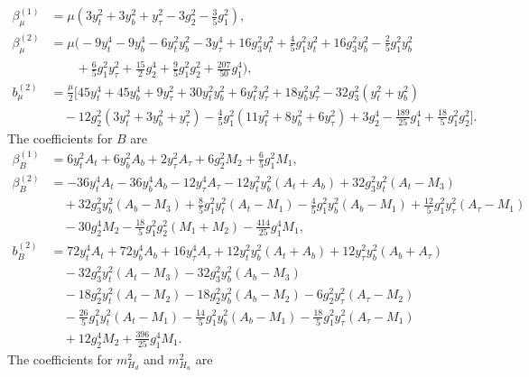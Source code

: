 \documentclass[preprint,amsmath,amssymb,aps,superscriptaddress,prd,showpacs,floatfix]{revtex4-1}
\begin{document}
\begin{subequations}\label{eq:MSSMmubetas}
\begin{align}
\beta_\mu^{(1)}&=\mu\left ( 3y_t^2+3y_b^2+y_\tau^2-3g_2^2-\frac{3}{5}g_1^2\right ),\label{eq:MSSMmubeta1}\\
\beta_\mu^{(2)}&=\mu \bigg ( -9y_t^4-9y_b^4-6y_t^2y_b^2-3y_\tau^4+16g_3^2y_t^2+\frac{4}{5}g_1^2y_t^2+16g_3^2y_b^2-\frac{2}{5}g_1^2y_b^2\nonumber\\
&\qquad{}+\frac{6}{5}g_1^2y_\tau^2+\frac{15}{2}g_2^4+\frac{9}{5}g_1^2g_2^2+\frac{207}{50}g_1^4\bigg ),\label{eq:MSSMmubeta2}\\
b_\mu^{(2)}&=\frac{\mu}{2}\Bigg [ 45y_t^4+45y_b^4+9y_\tau^2+30y_t^2y_b^2+6y_t^2y_\tau^2+18y_b^2y_\tau^2-32g_3^2(y_t^2+y_b^2)\nonumber\\
&\quad{}-12g_2^2(3y_t^2+3y_b^2+y_\tau^2)-\frac{4}{5}g_1^2(11y_t^2+8y_b^2+6y_\tau^2)+3g_2^4-\frac{189}{25}g_1^4+\frac{18}{5}g_1^2g_2^2\Bigg ].\label{eq:MSSMmub2}
\end{align}
\end{subequations}
The coefficients for $B$ are 
\begin{subequations}\label{eq:MSSMBbetas}
\begin{align}
\beta_B^{(1)}&=6y_t^2A_t+6y_b^2A_b+2y_\tau^2A_\tau+6g_2^2M_2+\frac{6}{5}g_1^2M_1,\label{eq:MSSMBbeta1}\\
\beta_B^{(2)}&=-36y_t^4A_t-36y_b^4A_b-12y_\tau^4A_\tau-12y_t^2y_b^2(A_t+A_b)+32g_3^2y_t^2(A_t-M_3)\nonumber\\
&\quad{}+32g_3^2y_b^2(A_b-M_3)+\frac{8}{5}g_1^2y_t^2(A_t-M_1)-\frac{4}{5}g_1^2y_b^2(A_b-M_1)+\frac{12}{5}g_1^2y_\tau^2(A_\tau-M_1)\nonumber\\
&\quad{}-30g_2^4M_2-\frac{18}{5}g_1^2g_2^2(M_1+M_2)-\frac{414}{25}g_1^4M_1,\label{eq:MSSMBbeta2}\\
b_B^{(2)}&=72y_t^4A_t+72y_b^4A_b+16y_\tau^4A_\tau+12y_t^2y_b^2(A_t+A_b)+12y_\tau^2y_b^2(A_b+A_\tau)\nonumber\\
&\quad{}-32g_3^2y_t^2(A_t-M_3)-32g_3^2y_b^2(A_b-M_3)\nonumber\\
&\quad{}-18g_2^2y_t^2(A_t-M_2)-18g_2^2y_b^2(A_b-M_2)-6g_2^2y_\tau^2(A_\tau-M_2)\nonumber\\
&\quad{}-\frac{26}{5}g_1^2y_t^2(A_t-M_1)-\frac{14}{5}g_1^2y_b^2(A_b-M_1)-\frac{18}{5}g_1^2y_\tau^2(A_\tau-M_1)\nonumber\\
&\quad{}+12g_2^4M_2+\frac{396}{25}g_1^4M_1.\label{eq:MSSMBb2}
\end{align}
\end{subequations}
The coefficients for $m_{H_d}^2$ and $m_{H_u}^2$ are 
\end{document}
